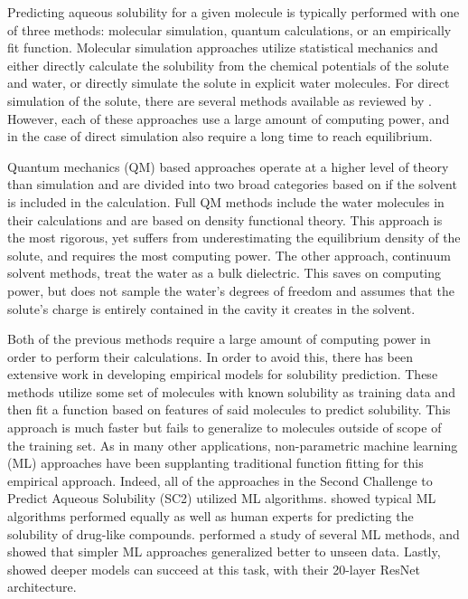 \documentclass[journal=jmcmar,manuscript=article]{achemso}
\begin{document}
Predicting aqueous solubility for a given molecule is typically performed with one of three methods: molecular simulation, quantum calculations, or an empirically fit function.
Molecular simulation approaches utilize statistical mechanics and either directly calculate the solubility from the chemical potentials of the solute and water\cite{denseStates}, or directly simulate the solute in explicit water molecules.
For direct simulation of the solute, there are several methods available as reviewed by \citet{solrev1}.
However, each of these approaches use a large amount of computing power, and in the case of direct simulation also require a long time to reach equilibrium.

Quantum mechanics (QM) based approaches operate at a higher level of theory than simulation and are divided into two broad categories based on if the solvent is included in the calculation. 
Full QM methods include the water molecules in their calculations and are based on density functional theory\cite{solrev1}.
This approach is the most rigorous, yet suffers from underestimating the equilibrium density of the solute\cite{solrev1}, and requires the most computing power.
The other approach, continuum solvent methods, treat the water as a bulk dielectric.
This saves on computing power, but does not sample the water's degrees of freedom and assumes that the solute's charge is entirely contained in the cavity it creates in the solvent.

Both of the previous methods require a large amount of computing power in order to perform their calculations.
In order to avoid this, there has been extensive work in developing empirical models for solubility prediction\cite{solrev1,solrev2}.
These methods utilize some set of molecules with known solubility as training data and then fit a function based on features of said molecules to predict solubility.
This approach is much faster but fails to generalize to molecules outside of scope of the training set.
As in many other applications, non-parametric machine learning (ML) approaches have been supplanting traditional function fitting for this empirical approach.
Indeed, all of the approaches in the Second Challenge to Predict Aqueous Solubility (SC2) utilized ML algorithms.\cite{llinas}
\citet{boobier} showed typical ML algorithms performed equally as well as human experts for predicting the solubility of drug-like compounds.
\citet{lovric} performed a study of several ML methods, and showed that simpler ML approaches generalized better to unseen data.
Lastly, \citet{cui} showed deeper models can succeed at this task, with their 20-layer ResNet architecture.
\end{document}
